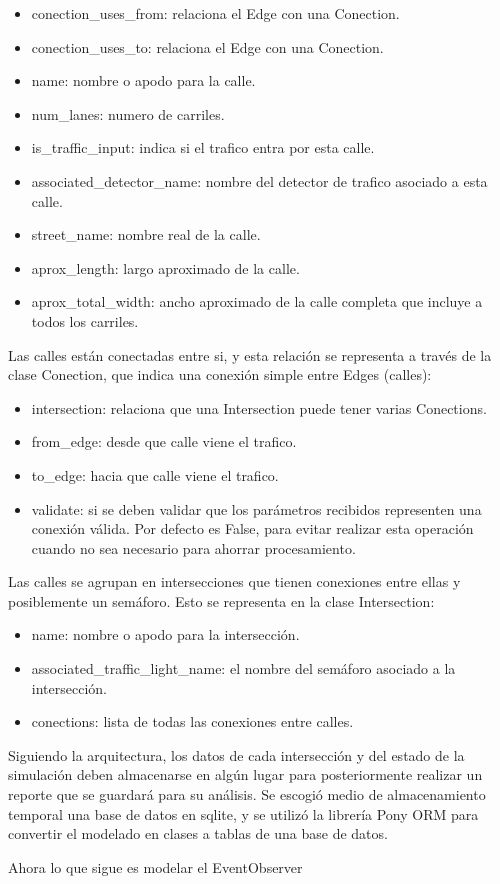 \begin{itemize}
\item
  conection\_uses\_from: relaciona el Edge con una Conection.
\item
  conection\_uses\_to: relaciona el Edge con una Conection.
\item
  name: nombre o apodo para la calle.
\item
  num\_lanes: numero de carriles.
\item
  is\_traffic\_input: indica si el trafico entra por esta calle.
\item
  associated\_detector\_name: nombre del detector de trafico asociado a
  esta calle.
\item
  street\_name: nombre real de la calle.
\item
  aprox\_length: largo aproximado de la calle.
\item
  aprox\_total\_width: ancho aproximado de la calle completa que incluye
  a todos los carriles.
\end{itemize}

Las calles están conectadas entre si, y esta relación se representa a
través de la clase Conection, que indica una conexión simple entre Edges
(calles):

\begin{itemize}
\item
  intersection: relaciona que una Intersection puede tener varias
  Conections.
\item
  from\_edge: desde que calle viene el trafico.
\item
  to\_edge: hacia que calle viene el trafico.
\item
  validate: si se deben validar que los parámetros recibidos representen
  una conexión válida. Por defecto es False, para evitar realizar esta
  operación cuando no sea necesario para ahorrar procesamiento.
\end{itemize}

Las calles se agrupan en intersecciones que tienen conexiones entre
ellas y posiblemente un semáforo. Esto se representa en la clase
Intersection:

\begin{itemize}
\item
  name: nombre o apodo para la intersección.
\item
  associated\_traffic\_light\_name: el nombre del semáforo asociado a la
  intersección.
\item
  conections: lista de todas las conexiones entre calles.
\end{itemize}

Siguiendo la arquitectura, los datos de cada intersección y del estado
de la simulación deben almacenarse en algún lugar para posteriormente
realizar un reporte que se guardará para su análisis. Se escogió medio
de almacenamiento temporal una base de datos en sqlite, y se utilizó la
librería Pony ORM para convertir el modelado en clases a tablas de una
base de datos.

Ahora lo que sigue es modelar el EventObserver

\clearpage %
